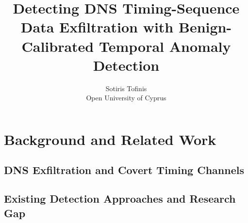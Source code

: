 \documentclass{vgtc}                          %
\title{Detecting DNS Timing-Sequence Data Exfiltration with Benign-Calibrated Temporal Anomaly Detection}
\author{Sotiris Tofinis\\ %
        \scriptsize Open University of Cyprus
}
\begin{document}
\maketitle

%



\section{Background and Related Work}

\subsection{DNS Exfiltration and Covert Timing Channels}


\subsection{Existing Detection Approaches and Research Gap}
\end{document}
